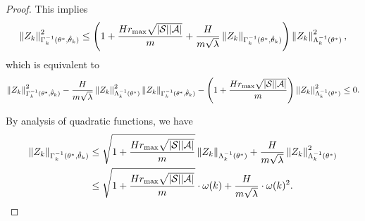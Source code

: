 \begin{proof}
	This implies
	\begin{align*}
		\left\| Z_k \right\|_{\Gamma_k^{-1}(\theta^*,\hat{\theta}_k)}^2 \leq \left(  1+  \frac{H r_{\max} \sqrt{|\mathcal{S}| |\mathcal{A}|}}{m}   + \frac{H}{m\sqrt{\lambda}} \left\|  Z_k  \right\|_{\Gamma_k^{-1}(\theta^*,\hat{\theta}_k)}  \right) \left\| Z_k \right\|_{\Lambda_k^{-1}(\theta^*)}^2 ,
	\end{align*}
	which is equivalent to
	\begin{align*}	\left\| Z_k \right\|_{\Gamma_k^{-1}(\theta^*,\hat{\theta}_k)}^2 - \frac{H}{m\sqrt{\lambda}}  \left\| Z_k \right\|_{\Lambda_k^{-1}(\theta^*)}^2 \left\|  Z_k  \right\|_{\Gamma_k^{-1}(\theta^*,\hat{\theta}_k)} - \left(  1+  \frac{H r_{\max} \sqrt{|\mathcal{S}| |\mathcal{A}|}}{m}  \right) \left\| Z_k \right\|_{\Lambda_k^{-1}(\theta^*)}^2 \leq 0 .
	\end{align*}
	
	By analysis of quadratic functions, we have
	\begin{align*}
		\left\| Z_k \right\|_{\Gamma_k^{-1}(\theta^*,\hat{\theta}_k)} &\leq \sqrt{ 1+  \frac{H r_{\max} \sqrt{|\mathcal{S}| |\mathcal{A}|}}{m} } \left\| Z_k \right\|_{\Lambda_k^{-1}(\theta^*)} + \frac{H}{m\sqrt{\lambda}}  \left\| Z_k \right\|_{\Lambda_k^{-1}(\theta^*)}^2 
		\\
		&\leq \sqrt{ 1+  \frac{H r_{\max} \sqrt{|\mathcal{S}| |\mathcal{A}|}}{m} } \cdot \omega(k) + \frac{H}{m\sqrt{\lambda}} \cdot \omega(k)^2  .
	\end{align*}
	
\end{proof}



